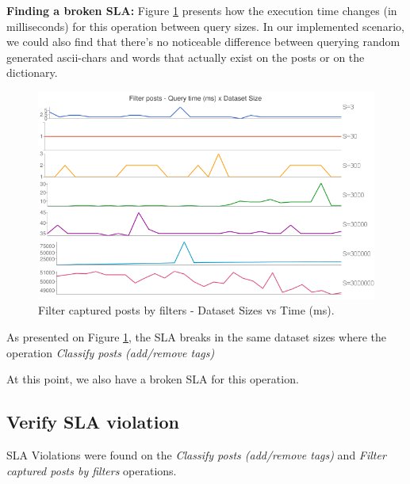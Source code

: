 \textbf{Finding a broken SLA: }
Figure \ref{fig:filter-captured-posts-by-filters} presents how the execution time changes (in milliseconds) for this operation between query sizes. In our implemented scenario, we could also find that there's no noticeable difference between querying random generated ascii-chars and words that actually exist on the posts or on the dictionary.

\begin{figure}[ht!]
\centering
\includegraphics[width=120mm]{Imagens/filter-posts-query-time.png}
\caption{Filter captured posts by filters - Dataset Sizes vs Time (ms).\label{fig:filter-captured-posts-by-filters}}
\end{figure}

As presented on Figure \ref{fig:filter-captured-posts-by-filters}, the SLA breaks in the same dataset sizes where the operation \textit{Classify posts (add/remove tags)}

At this point, we also have a broken SLA for this operation. 























\clearpage
\subsection{Verify SLA violation}
SLA Violations were found on the \textit{Classify posts (add/remove tags)} and \textit{Filter captured posts by filters} operations. 

